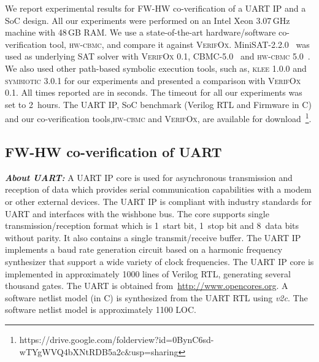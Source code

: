\documentclass[sigconf]{acmart}
\newcommand{\tool}[1]{\textsc{#1}\xspace}
\newcommand{\hwcbmcv}{\tool{hw-cbmc}}
\newcommand{\hwcbmcver}{\tool{hw-cbmc 5.0}}
\newcommand{\verifoxver}{\tool{VerifOx 0.1}}
\newcommand{\verifox}{\tool{VerifOx}}
\newcommand{\kleever}{\tool{klee 1.0.0}}
\newcommand{\symbioticver}{\tool{symbiotic 3.0.1}}
\newcommand{\Omit}[1]{}
\begin{document}
We report experimental results for FW-HW co-verification of a UART IP and a
SoC design.  All our experiments were performed on an Intel Xeon 3.07\,GHz
machine with 48\,GB RAM.  We use a state-of-the-art hardware/software
co-verification tool, \hwcbmcv, and compare it against \verifox. 
MiniSAT-2.2.0~\cite{DBLP:conf/sat/EenB05} was used as underlying SAT solver
with \verifoxver, CBMC-5.0~\cite{DBLP:conf/tacas/ClarkeKL04} and
\hwcbmcver~\cite{CK03}.  We also used other path-based symbolic execution
tools, such as, \kleever and \symbioticver for our experiments and presented
a comparison with \verifoxver.  All times reported are in seconds.  The
timeout for all our experiments was set to 2~hours.  The UART IP, SoC
benchmark (Verilog RTL and Firmware in C) and our co-verification
tools,\hwcbmcv and \verifox, are available for
download~\footnote{https://drive.google.com/folderview?id=0BynC6sd-wTYgWVQ4bXNtRDB5a2c\&usp=sharing}.

\Omit{
Even though \verifox supports SMT solvers such as
Z3~\cite{z32008} as backend solvers, the current implementation communicates
with these solvers using files rather than APIs.  Since a new solver
instance is generated for every query, incremental encoding cannot be used. 
Due to this, the runtimes of \verifox with SMT solvers on benchmarks are
significantly higher.  As the current implementation does not support
incremental encoding with SMT solvers, the runtimes would not provide a fair
comparison of \verifox with SMT versus \verifox with SAT solvers. 
Therefore, we are omitting the results obtained using SMT solvers.  

All the benchmarks in
Verilog (excluding commercial ARM IP), software-netlist models in C,
firmware models, our tool \textsc{Verifox} and scripts for running \hwcbmcv,
\cbmc, \textsc{klee} and \textsc{Symbiotic} are available
here~\footnote{https://drive.google.com/file/d/0BynC6sd-wTYgSEU5eEswbnRqWUE/view?usp=sharing}
}

\subsection{FW-HW co-verification of UART}

\textbf{\emph{About UART:}} A UART IP core is used for asynchronous
transmission and reception of data which provides serial communication
capabilities with a modem or other external devices.  The UART IP is
compliant with industry standards for UART and interfaces with the wishbone
bus.  The core supports single transmission/reception format which is
1~start bit, 1~stop bit and 8~data bits without parity.  It also contains a
single transmit/receive buffer.  The UART IP implements a baud rate
generation circuit based on a harmonic frequency synthesizer that support a
wide variety of clock frequencies.  The UART IP core is implemented in
approximately 1000 lines of Verilog RTL, generating several thousand gates. 
The UART is obtained from~\url{http://www.opencores.org}.  A software
netlist model (in C) is synthesized from the UART RTL using \emph{v2c}.  The
software netlist model is approximately 1100 LOC.
\end{document}
